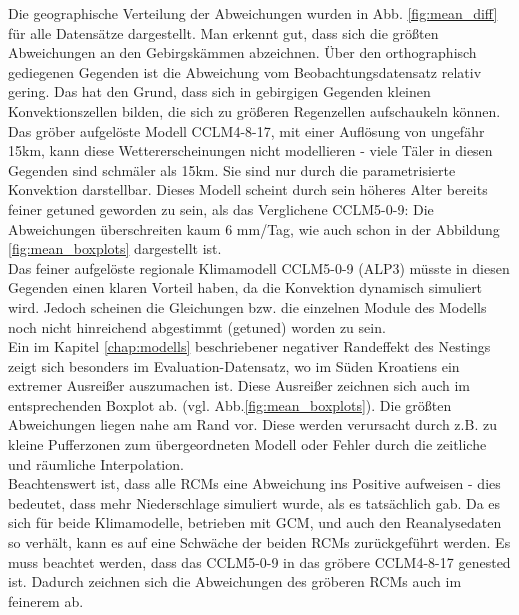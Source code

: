Die geographische Verteilung der Abweichungen wurden in Abb. \ref{fig:mean_diff} für alle Datensätze dargestellt. Man erkennt gut, dass sich die größten Abweichungen an den Gebirgskämmen abzeichnen. Über den orthographisch gediegenen Gegenden ist die Abweichung vom Beobachtungsdatensatz relativ gering. Das hat den Grund, dass sich in gebirgigen Gegenden  kleinen Konvektionszellen bilden, die sich zu größeren Regenzellen aufschaukeln können. Das gröber aufgelöste Modell CCLM4-8-17, mit einer Auflösung von ungefähr 15km, kann diese Wettererscheinungen nicht modellieren - viele Täler in diesen Gegenden sind schmäler als 15km. Sie sind nur durch die parametrisierte Konvektion darstellbar. Dieses Modell scheint durch sein höheres Alter bereits feiner getuned geworden zu sein, als das Verglichene CCLM5-0-9: Die Abweichungen überschreiten kaum 6 mm/Tag, wie auch schon in der Abbildung \ref{fig:mean_boxplots} dargestellt ist.\\
Das feiner aufgelöste regionale Klimamodell CCLM5-0-9 (ALP3) müsste in diesen Gegenden einen klaren Vorteil haben, da die Konvektion dynamisch simuliert wird. Jedoch scheinen die Gleichungen bzw. die einzelnen Module des Modells noch nicht hinreichend abgestimmt (getuned) worden zu sein.\\
Ein im Kapitel \ref{chap:modells} beschriebener negativer Randeffekt des Nestings zeigt sich besonders im Evaluation-Datensatz, wo im Süden Kroatiens ein extremer Ausreißer auszumachen ist. Diese Ausreißer zeichnen sich auch im entsprechenden Boxplot ab. (vgl. Abb.\ref{fig:mean_boxplots}). Die größten Abweichungen liegen nahe am Rand vor. Diese werden verursacht durch z.B. zu kleine Pufferzonen zum übergeordneten Modell oder Fehler durch die zeitliche und räumliche Interpolation.\\
Beachtenswert ist, dass alle RCMs eine Abweichung ins Positive aufweisen - dies bedeutet, dass mehr Niederschlage simuliert wurde, als es tatsächlich gab. Da es sich für beide Klimamodelle, betrieben mit GCM, und auch den Reanalysedaten so verhält, kann es auf eine Schwäche der beiden RCMs zurückgeführt werden. Es muss beachtet werden, dass das CCLM5-0-9 in das gröbere CCLM4-8-17 genested ist. Dadurch zeichnen sich die Abweichungen des gröberen RCMs auch im feinerem ab.

